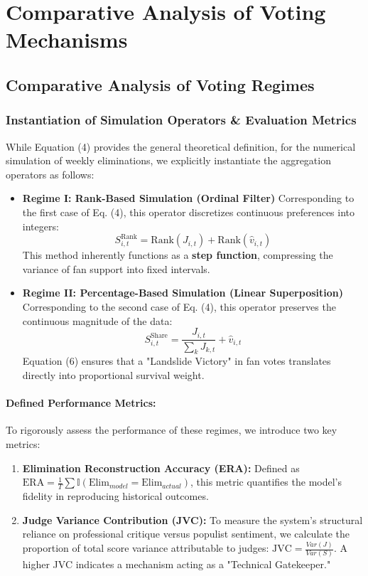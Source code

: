 \documentclass{mcmthesis}
\begin{document}
\section{Comparative Analysis of Voting Mechanisms}

\subsection{Comparative Analysis of Voting Regimes}
\subsubsection{Instantiation of Simulation Operators \& Evaluation Metrics}
While Equation (4) provides the general theoretical definition, for the numerical simulation of weekly eliminations, we explicitly instantiate the aggregation operators as follows:

\begin{itemize}
	\item \textbf{Regime I: Rank-Based Simulation (Ordinal Filter)}
	Corresponding to the first case of Eq. (4), this operator discretizes continuous preferences into integers:
	\begin{equation}
		S_{i,t}^{\text{Rank}} = \text{Rank}(J_{i,t}) + \text{Rank}(\hat{v}_{i,t}) 
		\label{eq:rank_sim}
	\end{equation}
	This method inherently functions as a \textbf{step function}, compressing the variance of fan support into fixed intervals.
	
	\item \textbf{Regime II: Percentage-Based Simulation (Linear Superposition)}
	Corresponding to the second case of Eq. (4), this operator preserves the continuous magnitude of the data:
	\begin{equation}
		S_{i,t}^{\text{Share}} = \frac{J_{i,t}}{\sum_{k} J_{k,t}} + \hat{v}_{i,t}
		\label{eq:share_sim}
	\end{equation}
	Equation (6) ensures that a "Landslide Victory" in fan votes translates directly into proportional survival weight.
\end{itemize}

\paragraph{Defined Performance Metrics:} To rigorously assess the performance of these regimes, we introduce two key metrics:
\begin{enumerate}
	\item \textbf{Elimination Reconstruction Accuracy (ERA):} Defined as $\text{ERA} = \frac{1}{T} \sum \mathbb{I}(\text{Elim}_{model} = \text{Elim}_{actual})$, this metric quantifies the model's fidelity in reproducing historical outcomes.
	\item \textbf{Judge Variance Contribution (JVC):} To measure the system's structural reliance on professional critique versus populist sentiment, we calculate the proportion of total score variance attributable to judges: $\text{JVC} = \frac{Var(J)}{Var(S)}$. A higher JVC indicates a mechanism acting as a "Technical Gatekeeper."
\end{enumerate}
\end{document}
